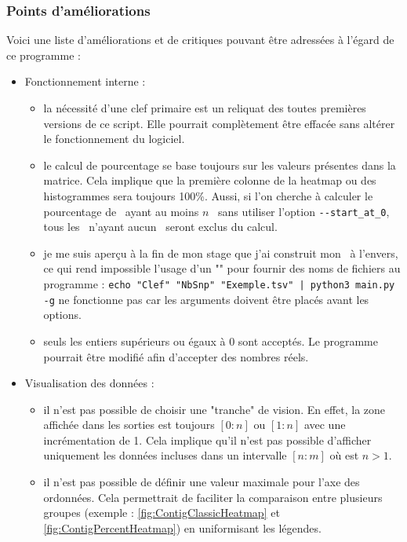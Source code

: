 \documentclass[../main]{subfiles} %
\begin{document}
\subsubsection{Points d'améliorations}
Voici une liste d'améliorations et de critiques pouvant être adressées à l'égard de ce programme :

\begin{itemize}
    \item Fonctionnement interne :
        \begin{itemize}
            \item la nécessité d'une clef primaire est un reliquat des toutes premières versions de ce script. Elle pourrait complètement être effacée sans altérer le fonctionnement du logiciel.   

            \item le calcul de pourcentage se base toujours sur les valeurs présentes dans la matrice. Cela implique que la première colonne de la heatmap ou des histogrammes sera toujours 100\%. Aussi, si l'on cherche à calculer le pourcentage de \contigs ayant au moins $n$ \SNP sans utiliser l'option  \lstinline{--start_at_0}, tous les \contigs n'ayant aucun \SNP seront exclus du calcul.
   
            \item je me suis aperçu à la fin de mon stage que j'ai construit mon \getopts à l'envers, ce qui rend impossible l'usage d'un "\pipe" pour fournir des noms de fichiers au programme : \lstinline{echo "Clef" "NbSnp" "Exemple.tsv" | python3 main.py -g} ne fonctionne pas car les arguments doivent être placés avant les options. 


            \item seuls les entiers supérieurs ou égaux à 0 sont acceptés. Le programme pourrait être modifié afin d'accepter des nombres réels.
    
        \end{itemize}

    \item Visualisation des données :
        \begin{itemize}
            \item il n'est pas possible de choisir une "tranche" de vision. En effet, la zone affichée dans les sorties est toujours $[0:n]$ ou $[1:n]$ avec une incrémentation de 1. Cela implique qu'il n'est pas possible d'afficher uniquement les données incluses dans un intervalle $[n:m]$ où est $n>1$.
            
            \item il n'est pas possible de définir une valeur maximale pour l'axe des ordonnées. Cela permettrait de faciliter la comparaison entre plusieurs groupes (exemple : \cref{fig:ContigClassicHeatmap} et \cref{fig:ContigPercentHeatmap}) en uniformisant les légendes.  


\end{itemize}
\end{itemize}
\end{document}
